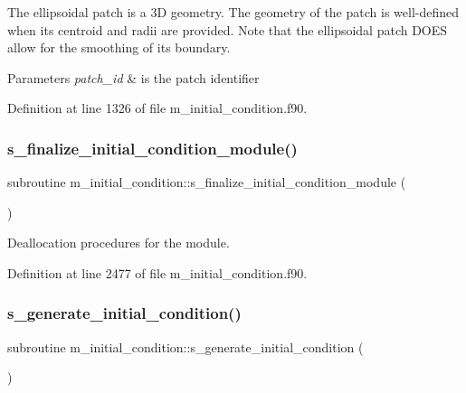 The ellipsoidal patch is a 3D geometry. The geometry of the patch is well-\/defined when its centroid and radii are provided. Note that the ellipsoidal patch D\+O\+ES allow for the smoothing of its boundary. 


\begin{DoxyParams}{Parameters}
{\em patch\+\_\+id} & is the patch identifier \\
\hline
\end{DoxyParams}


Definition at line 1326 of file m\+\_\+initial\+\_\+condition.\+f90.

\mbox{\label{namespacem__initial__condition_a944c63abd61afab021ab664246f80495}} 
\subsubsection{\texorpdfstring{s\+\_\+finalize\+\_\+initial\+\_\+condition\+\_\+module()}{s\_finalize\_initial\_condition\_module()}}
{\footnotesize\ttfamily subroutine m\+\_\+initial\+\_\+condition\+::s\+\_\+finalize\+\_\+initial\+\_\+condition\+\_\+module (\begin{DoxyParamCaption}{ }\end{DoxyParamCaption})}



Deallocation procedures for the module. 



Definition at line 2477 of file m\+\_\+initial\+\_\+condition.\+f90.

\mbox{\label{namespacem__initial__condition_aa74a70029e3ec0fd3225b369e7c5443e}} 
\subsubsection{\texorpdfstring{s\+\_\+generate\+\_\+initial\+\_\+condition()}{s\_generate\_initial\_condition()}}
{\footnotesize\ttfamily subroutine m\+\_\+initial\+\_\+condition\+::s\+\_\+generate\+\_\+initial\+\_\+condition (\begin{DoxyParamCaption}{ }\end{DoxyParamCaption})}



